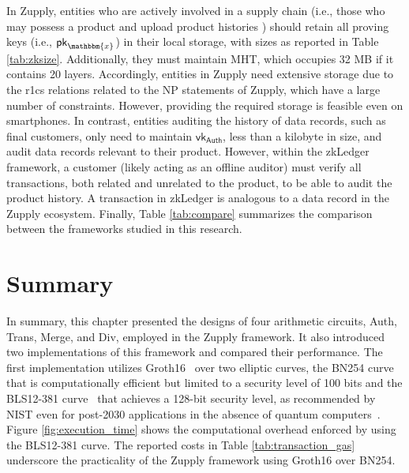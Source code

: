 In Zupply, entities who are actively involved in a supply chain (i.e., those who may possess a product and upload product histories ) should retain all proving keys (i.e., $\mathsf{pk}_\mathbbm{x}$) in their local storage, with sizes as reported in Table \ref{tab:zksize}. Additionally, they must maintain \textsf{MHT}, which occupies 32 MB if it contains 20 layers. Accordingly, entities in Zupply need extensive storage due to the \gls{r1cs} relations related to the NP statements of Zupply, which have a large number of constraints. However, providing the required storage is feasible even on smartphones. In contrast, entities auditing the history of data records, such as final customers, only need to maintain $\mathsf{vk}_\mathsf{Auth}$, less than a kilobyte in size, and audit data records relevant to their product. However, within the zkLedger framework, a customer (likely acting as an offline auditor) must verify all transactions, both related and unrelated to the product, to be able to audit the product history. A transaction in zkLedger is analogous to a data record in the Zupply ecosystem. Finally, Table \ref{tab:compare} summarizes the comparison between the frameworks studied in this research.

\section{Summary}

In summary, this chapter presented the designs of four arithmetic circuits, \textsf{Auth}, \textsf{Trans}, \textsf{Merge}, and \textsf{Div}, employed in the Zupply framework. It also introduced two implementations of this framework and compared their performance. The first implementation utilizes Groth16~\cite{Groth2016} over two elliptic curves, the BN254 curve~\cite{BNcurve} that  is computationally efficient but limited to a security level of 100 bits \cite{Barbulescu2019} and the BLS12-381 curve~\cite{BLS_curve2003} that achieves a 128-bit security level, as recommended by NIST even for post-2030 applications in the absence of quantum computers~\cite{NIST-SP-800-57-Part1-Rev5}. Figure \ref{fig:execution_time} shows the computational overhead enforced by using the BLS12-381 curve.  The reported costs in Table \ref{tab:transaction_gas} underscore the practicality of the Zupply framework using Groth16 over BN254.


